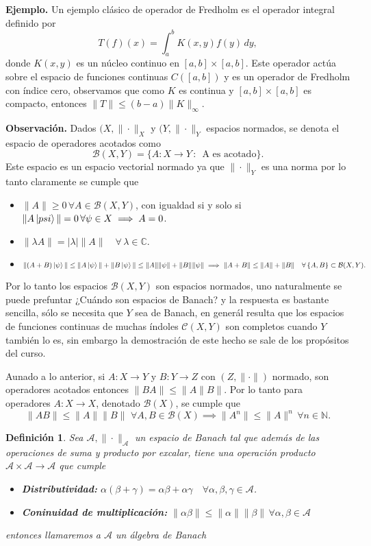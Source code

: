 \documentclass[letterpaper]{book}
\newtheorem{def.}{Definici\'on}[section]
\newcommand{\nat}{\ensuremath{ \mathbb N }}
\newcommand{\eje}{{\noindent \sc \textbf{Ejemplo. }}}
\newcommand{\obs}{{\noindent \sc \textbf{Observación. }}}
\newcommand{\co}{\ensuremath{\mathbb C }}
\begin{document}
\eje Un ejemplo clásico de operador de Fredholm es el operador integral definido por
\[
T(f)(x) = \int_a^b K(x, y) f(y) \, dy,
\]
donde \(K(x, y)\) es un núcleo continuo en \([a, b] \times [a, b]\). Este operador actúa sobre el espacio de funciones continuas \(C([a, b])\) y es un operador de Fredholm con índice cero, observamos que como \(K\) es continua y  \([a, b] \times [a, b]\) es compacto, entonces \(\|T\|\leq(b-a)\|K\|_{\infty}\).

\obs Dados \((X,\|\cdot\|_X\) y \((Y,\|\cdot\|_Y\) espacios normados, se denota el espacio de operadores acotados como
\[
\mathcal{B}(X,Y)=\{A:X\to Y\,:\,\text{ A es acotado}\}.
\]
\noindent Este espacio es un espacio vectorial normado ya que \(\|\cdot\|_Y\) es una norma por lo tanto claramente se cumple que
\begin{itemize}
    \item \(\|A\| \geq 0\,\forall A \in\mathcal{B}(X,Y) \), con igualdad si y solo si \(\|A\ket{psi}\| = 0\,\forall\psi\in X\implies A = 0\).
    \item \(\|\lambda A\| = |\lambda|\|A\|\quad\forall\,\lambda\in\co.\)
    \item \(\|(A + B)\ket{\psi}\| \leq \|A\ket{\psi}\| + \|B\ket{\psi}\|\leq \|A\|\|\psi\| + \|B\|\|\psi\| \implies\| A + B\| \leq \|A\| + \|B\|\quad\forall\,\{A,B\}\subset\mathcal{B}(X,Y).\)
\end{itemize}

Por lo tanto los espacios \(\mathcal{B}(X,Y)\) son espacios normados, uno naturalmente se puede prefuntar ¿Cuándo son espacios de Banach? y la respuesta es bastante sencilla, sólo se necesita que \(Y\) sea de Banach, en generál resulta que los espacios de funciones continuas de muchas índoles \(\mathcal{C}(X,Y)\) son completos cuando \(Y\) también lo es, sin embargo la demostración de este hecho se sale de los propósitos del curso.

Aunado a lo anterior, si \(A:X\to Y\) y \(B:Y\to Z\) con \((Z,\|\cdot\|)\) normado, son operadores acotados entonces \(\|BA\|\leq\|A\|B\|\). Por lo tanto para operadores \(A:X\to X\), denotado \(\mathcal{B}(X)\), se cumple que
\[
\|AB\|\leq\|A\|\|B\|\,\,\forall A,B\in\mathcal{B}(X)\implies\|A^n\|\leq\|A\|^n\,\forall n\in\nat.
\]

\begin{def.}
Sea \(\mathcal{A},\|\cdot\|_{\mathcal{A}}\) un espacio de Banach tal que además de las operaciones de suma y producto por excalar, tiene una operación producto \(\mathcal{A}\times\mathcal{A}\to\mathcal{A}\) que cumple
\begin{itemize}
    \item \textbf{Distributividad:} \(\alpha(\beta+\gamma)=\alpha\beta+\alpha\gamma\quad\forall\alpha,\beta,\gamma\in\mathcal{A}\).
    \item \textbf{Coninuidad de multiplicación:} \(\|\alpha\beta\|\leq\|\alpha\|\|\beta\|\,\forall\alpha,\beta\in\mathcal{A}\)
\end{itemize}
entonces llamaremos a \(\mathcal{A}\) un \emph{álgebra de Banach}
\end{def.}
\end{document}
